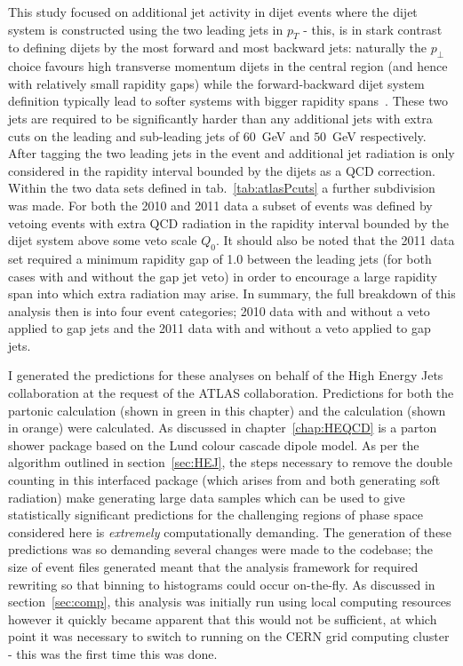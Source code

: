 	This study focused on additional jet activity in dijet events where the dijet system
	is constructed using the two leading jets in $p_T$ - this, is in stark contrast to
	defining dijets by the most forward and most backward jets: naturally the $p_\perp$
	choice favours high transverse momentum dijets in the central region (and hence with
	relatively small rapidity gaps) while the forward-backward dijet system definition
	typically lead to softer systems with bigger rapidity spans~\cite{Abazov:2013gpa}.
	These two jets are required
	to be significantly harder than any additional jets with extra cuts on the leading
	and sub-leading jets of $60$~GeV and $50$~GeV respectively.  After tagging the two
	leading jets in the event and additional jet radiation is only considered in the rapidity
	interval bounded by the dijets as a QCD correction.  Within the two data sets
	defined in tab.~\eqref{tab:atlasPcuts} a further subdivision was made.  For both the
	2010 and 2011 data a subset of events was defined by vetoing events with extra
	QCD radiation in the rapidity interval bounded by the dijet system above some veto
	scale $Q_0$.  It should also be noted that the 2011 data set required a minimum
	rapidity gap of 1.0 between the leading jets (for both cases with and without the gap jet
	veto) in order to encourage a large rapidity span into which extra radiation may arise.
	In summary, the full breakdown of this analysis then is into four event categories;
	2010 data with and without a veto applied to gap jets and the 2011 data with and
	without a veto applied to gap jets.

	I generated the predictions for these analyses on behalf of the High Energy Jets
	collaboration at the request of the ATLAS collaboration. Predictions for both
	the partonic \HEJ calculation (shown in green in this chapter) and the \HEJA
	calculation (shown in orange) were calculated. As discussed in chapter~\ref{chap:HEQCD} \ARIADNE is a parton shower package
	based on the Lund colour cascade dipole model. As per the algorithm outlined in section~\ref{sec:HEJ}, the steps necessary to remove the
	double counting in this interfaced package (which arises from \HEJ and \ARIADNE both
	generating soft radiation) make generating large data samples which can be used to give
	statistically significant predictions for the challenging regions of phase space considered
	here is \emph{extremely} computationally demanding.  The generation of these
	predictions was so demanding several changes were made to the \HEJ codebase; the
	size of event files generated meant that the analysis framework for \hej required
	rewriting so that binning to histograms could occur on-the-fly.  As discussed in section~\ref{sec:comp}, this analysis was
	initially run using local computing resources however it quickly became apparent
	that this would not be sufficient, at which point it was necessary to switch to
	running \HEJ on the CERN grid computing cluster - this was the first time this was done.


